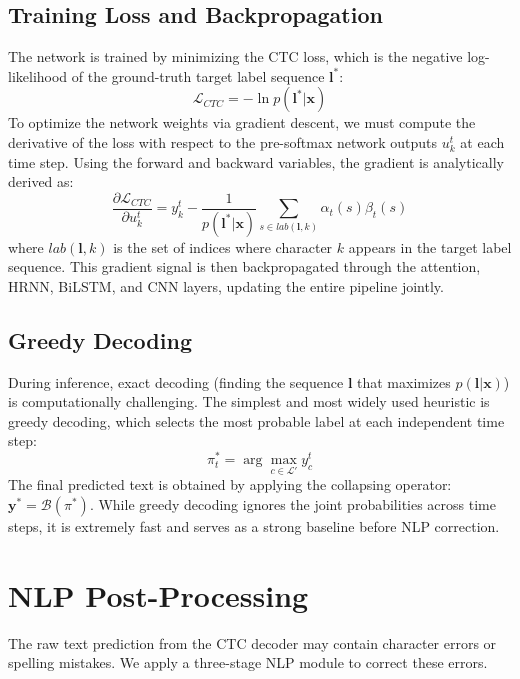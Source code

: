 \subsection{Training Loss and Backpropagation}
The network is trained by minimizing the CTC loss, which is the negative log-likelihood of the ground-truth target label sequence $\mathbf{l^*}$:
\begin{equation}
    \mathcal{L}_{CTC} = -\ln p(\mathbf{l^*} | \mathbf{x})
\end{equation}
To optimize the network weights via gradient descent, we must compute the derivative of the loss with respect to the pre-softmax network outputs $u_k^t$ at each time step. Using the forward and backward variables, the gradient is analytically derived as:
\begin{equation}
    \frac{\partial \mathcal{L}_{CTC}}{\partial u_k^t} = y_k^t - \frac{1}{p(\mathbf{l^*} | \mathbf{x})} \sum_{s \in lab(\mathbf{l}, k)} \alpha_t(s) \beta_t(s)
\end{equation}
where $lab(\mathbf{l}, k)$ is the set of indices where character $k$ appears in the target label sequence. This gradient signal is then backpropagated through the attention, HRNN, BiLSTM, and CNN layers, updating the entire pipeline jointly.

\subsection{Greedy Decoding}
During inference, exact decoding (finding the sequence $\mathbf{l}$ that maximizes $p(\mathbf{l} | \mathbf{x})$) is computationally challenging. The simplest and most widely used heuristic is greedy decoding, which selects the most probable label at each independent time step:
\begin{equation}
    \pi^*_t = \arg\max_{c \in \mathcal{L}'} y_c^t
\end{equation}
The final predicted text is obtained by applying the collapsing operator: $\mathbf{y}^* = \mathcal{B}(\pi^*)$. While greedy decoding ignores the joint probabilities across time steps, it is extremely fast and serves as a strong baseline before NLP correction.

\section{NLP Post-Processing}
The raw text prediction from the CTC decoder may contain character errors or spelling mistakes. We apply a three-stage NLP module to correct these errors.

